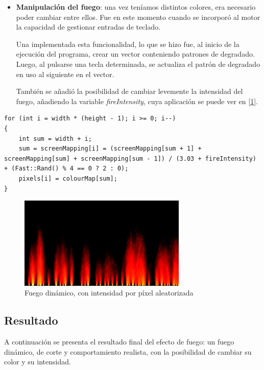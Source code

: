 \begin{itemize}
	\item \textbf{Manipulación del fuego}: una vez teníamos distintos colores, era necesario poder cambiar entre ellos. Fue en este momento cuando se incorporó al motor la capacidad de gestionar entradas de teclado.
	
	Una implementada esta funcionalidad, lo que se hizo fue, al inicio de la ejecución del programa, crear un vector conteniendo patrones de degradado. Luego, al pulsarse una tecla determinada, se actualiza el patrón de degradado en uso al siguiente en el vector.
	
	También se añadió la posibilidad de cambiar levemente la intensidad del fuego, añadiendo la variable \emph{fireIntensity}, cuya aplicación se puede ver en [\ref{fig:fire_final}].
\end{itemize}

\begin{lstlisting}[style=C-color, caption={Algoritmo final de efecto de fuego},label=cod:finalFire]
for (int i = width * (height - 1); i >= 0; i--)
{
    int sum = width + i;
    sum = screenMapping[i] = (screenMapping[sum + 1] + screenMapping[sum] + screenMapping[sum - 1]) / (3.03 + fireIntensity) + (Fast::Rand() % 4 == 0 ? 2 : 0);
    pixels[i] = colourMap[sum];
}
\end{lstlisting}

\begin{figure}[h]
	\centering
	\includegraphics[width=8cm]{archivos/fire_final}
	\caption{Fuego dinámico, con intensidad por píxel aleatorizada}
	\label{fig:fire_final}
\end{figure}

\subsection{Resultado}

A continuación se presenta el resultado final del efecto de fuego: un fuego dinámico, de corte y comportamiento realista, con la posibilidad de cambiar su color y su intensidad.

